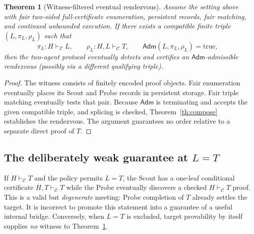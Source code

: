 \documentclass[11pt,letterpaper]{article}
\newtheorem{theorem}{Theorem}[section]
\theoremstyle{definition}
\newcommand{\vdC}{\vdash_{\mathcal C}}
\newcommand{\Adm}{\mathsf{Adm}}
\begin{document}
\begin{theorem}[Witness-filtered eventual rendezvous]\label{th:witness}
Assume the setting above with fair two-sided \emph{full-certificate}
enumeration, persistent records, fair matching, and continued unbounded
execution. If there exists a compatible finite triple $(L,\pi_L,\rho_L)$
such that
\[
 \pi_L:H\vdC L,\qquad \rho_L:H,L\vdC T,
 \qquad \Adm(L,\pi_L,\rho_L)=\mathrm{true},
\]
then the two-agent protocol eventually detects and certifies an
$\Adm$-admissible rendezvous (possibly via a different qualifying triple).
\end{theorem}
\begin{proof}
The witness consists of finitely encoded proof objects. Fair enumeration
eventually places its Scout and Probe records in persistent storage.
Fair triple matching eventually tests that pair. Because $\Adm$ is
terminating and accepts the given compatible triple, and splicing is
checked, Theorem~\ref{th:compose} establishes the rendezvous. The
argument guarantees no order relative to a separate direct proof of $T$.
\end{proof}

\subsection{The deliberately weak guarantee at $L=T$}
If $H\vdC T$ and the policy permits $L=T$, the Scout has a one-leaf
conditional certificate $H,T\vdC T$ while the Probe eventually discovers
a checked $H\vdC T$ proof. This is a valid but \emph{degenerate} meeting:
Probe completion of $T$ already settles the target. It is incorrect to
promote this statement into a guarantee of a useful internal bridge.
Conversely, when $L=T$ is excluded, target provability by itself supplies
\emph{no} witness to Theorem~\ref{th:witness}.
\end{document}
